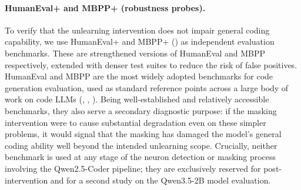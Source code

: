 \documentclass[mscthesis]{usiinfthesis}
\begin{document}
\paragraph{HumanEval+ and MBPP+ (robustness probes).}
To verify that the unlearning intervention does not impair general coding capability,
we use HumanEval+ and MBPP+ (\citet{liu2023codegeneratedchatgptreally}) as independent
evaluation benchmarks. These are strengthened versions of HumanEval and MBPP respectively,
extended with denser test suites to reduce the risk of false positives. HumanEval and MBPP are the most widely adopted
benchmarks for code generation evaluation, used as standard reference points across a large
body of work on code LLMs (\citet{hui2024qwen25codertechnicalreport}, \citet{li2026manifoldguidedattentionsteering},
\citet{ouyang2026executionstaticanalysisrewardshintconditioned}). Being well-established and
relatively accessible benchmarks, they also serve a secondary diagnostic purpose: if the
masking intervention were to cause substantial degradation even on these simpler problems,
it would signal that the masking has damaged the model's general coding ability well beyond
the intended unlearning scope. Crucially, neither benchmark is used at any stage of the
neuron detection or masking process involving the Qwen2.5-Coder pipeline; they are exclusively reserved for post-intervention and for a second study on the Qwen3.5-2B model evaluation.
\end{document}
